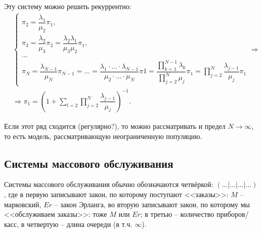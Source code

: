 Эту систему можно решить рекуррентно:
\begin{align*}
  &\begin{cases}
    \pi_2 = \dfrac{\lambda_1}{\mu_2} \pi_1, \\
    \pi_3 = \dfrac{\lambda_2}{\mu_3} \pi_2 = \dfrac{\lambda_2 \lambda_1}{\mu_3 \mu_2} \pi_1, \\
    \dots \\
    \pi_N = \dfrac{\lambda_{N-1}}{\mu_N} \pi_{N-1}
    = \dots
    = \dfrac{\lambda_1 \cdot \dots \cdot \lambda_{N-1}}{\mu_2 \cdot \dots \cdot \mu_N} \pi 1
    = \dfrac{\prod_{k=1}^{N-1} \lambda_k}{\prod_{j=2}^N \mu_j} \pi_1
    = \prod_{j=2}^N \dfrac{\lambda_{j-1}}{\mu_j} \pi_1
  \end{cases}
  \Rightarrow \\
  &\Rightarrow \pi_1 = \left( 1 + \sum_{l=2}\prod_{j=2}^N \dfrac{\lambda_{j-1}}{\mu_j} \right)^{-1}.
\end{align*}

Если этот ряд сходится (регулярно?), то можно рассматривать и предел
$N \to \infty$, то есть модель, рассматривающую неограниченную популяцию.



\subsection{Системы массового обслуживания}

Системы массового обслуживания обычно обозначаются четвёркой: $(\dots | \dots | \dots | \dots)$,
где в первую записывают закон, по которому поступают <<заказы>>: $M$ -- марковский, %
$Er$ -- закон Эрланга,
во вторую записывают закон, по которому мы <<обслуживаем заказы>>: тоже $M$ или $Er$;
в третью -- количество приборов/касс,
в четвертую -- длина очереди (в т.ч. $\infty$).

